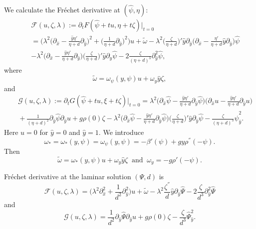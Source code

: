 \documentclass[a4paper,reqno,12pt]{amsart}
\theoremstyle{plain}
\theoremstyle{definition}
\numberwithin{equation}{section}
\begin{document}
We calculate the Fr\'{e}chet derivative at $(\hat{\psi},\eta)$:
\begin{eqnarray}\label{Ju28a}
&&{\mathcal F}(u,\zeta,\lambda):=\partial_tF(\hat{\psi}+tu,\eta+t\zeta)|_{t=0}\nonumber\\
&&=\Big(\lambda^2\Big(\partial_{\hat{x}}-\frac{\hat{y}\eta'}{\eta+d}
\partial_{\hat{y}}\Big)^2+\Big(\frac{1}{\eta+d}\partial_{\hat{y}}\Big)^2\Big)
u+\tilde{\omega}
-\lambda^2\Big(\frac{\zeta}{\eta+d}\Big)'\hat{y}\partial_{\hat{y}}
\Big(\partial_{\hat{x}}
-\frac{\eta'}{\eta+d}{\hat{y}}
\partial_{\hat{y}}\Big)\hat{\psi}\nonumber\\
&&-\lambda^2\Big(\partial_{\hat{x}}-\frac{\hat{y}\eta'}{\eta+d}\partial_{\hat{y}}\Big)
\Big(\frac{\zeta}{\eta+d}\Big)'\hat{y}\partial_{\hat{y}}\hat{\psi}
-2\frac{\zeta}{(\eta+d)^3}\partial_{\hat{y}}^2\hat{\psi},
\end{eqnarray}
where
$$
\tilde{\omega}=\omega_\psi(y,\psi)u+\omega_y\hat{y}\zeta,
$$
and
\begin{eqnarray}\label{Ju28aa}
&&{\mathcal G}(u,\zeta,\lambda):=\partial_tG(\hat{\psi}+tu,\xi+t\zeta)|_{t=0}=
\lambda^2\Big(\partial_{\hat{x}}\hat{\psi}-\frac{\hat{y}\eta'}{\eta+d}\partial_{\hat{y}}
\hat{\psi}\Big)\Big(\partial_{\hat{x}}u
-\frac{\hat{y}\eta'}{\eta+d}\partial_{\hat{y}}u\Big)\nonumber\\
&&\!\!\!+\!\!\frac{1}{(\eta+d)^2}\partial_{\hat{y}}\hat{\psi}\partial_{\hat{y}}u
\!\!+\!\!g\rho(0)\zeta
\!\!-\!\!\lambda^2\Big(\partial_{\hat{x}}\hat{\psi}-\frac{\hat{y}\eta'}{\eta+d}\partial_{\hat{y}}
\hat{\psi}\Big)\Big(\frac{\zeta}{\eta+d}\Big)'\hat{y}\partial_{\hat{y}}\hat{\psi}
\!\!-\!\frac{\zeta}{(\eta+d)^3}\hat{\psi}_{\hat{y}}^2.
\end{eqnarray}
Here $u=0$ for $\hat{y}=0$ and $\hat{y}=1$. We introduce
\begin{equation}\label{A16a}
\omega_*=\omega_*(y,\psi)=\omega_\psi(y,\psi)=-\beta'(\psi)+gy\rho^{''}(-\psi).
\end{equation}
Then
\begin{equation}\label{A16aa}
\tilde{\omega}=\omega_*(y,\psi)u+\omega_y\hat{y}\zeta\;\;\mbox{and}\;\;\omega_y=-g\rho'(-\psi).
\end{equation}

Fr\'{e}chet derivative at the laminar solution $(\Psi,d)$ is
\begin{equation}\label{Ju28az}
{\mathcal F}(u,\zeta,\lambda)=
\Big(\lambda^2\partial_{\hat{x}}^2+\frac{1}{d^2}\partial_{\hat{y}}^2\Big)
u+\tilde{\omega}
-\lambda^2\frac{\zeta^{''}}{d}\hat{y}\partial_{\hat{y}}\hat{\Psi}
-2\frac{\zeta}{d^3}\partial_{\hat{y}}^2\hat{\Psi}
\end{equation}
and
\begin{equation}\label{Ju28aaz}
{\mathcal G}(u,\zeta,\lambda)=
\frac{1}{d^2}\partial_{\hat{y}}\hat{\Psi}\partial_{\hat{y}}u
+g\rho(0)\zeta
-\frac{\zeta}{d^3}\hat{\Psi}_{\hat{y}}^2.
\end{equation}
\end{document}
